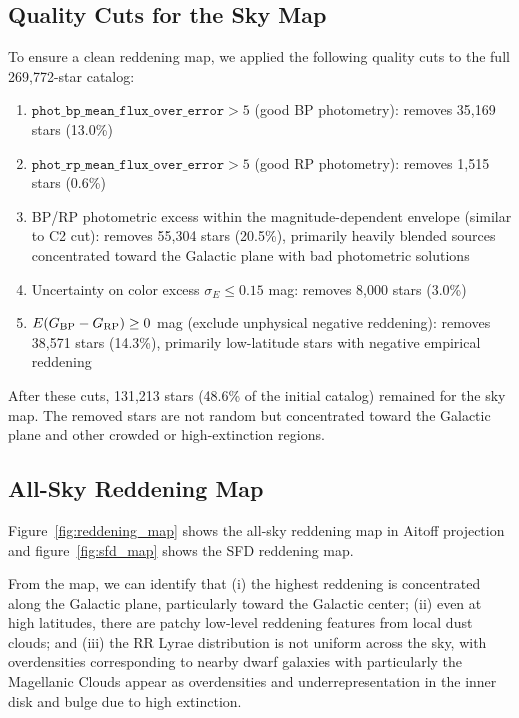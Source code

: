 \documentclass[10pt,preprint2]{aastex}
\begin{document}
\subsection{Quality Cuts for the Sky Map}

To ensure a clean reddening map, we applied the following quality cuts to the full 269,772-star catalog:
\begin{enumerate}
  \item $\texttt{phot\_bp\_mean\_flux\_over\_error} > 5$ (good BP photometry): removes 35,169 stars (13.0\%)
  \item $\texttt{phot\_rp\_mean\_flux\_over\_error} > 5$ (good RP photometry): removes 1,515 stars (0.6\%)
  \item BP/RP photometric excess within the magnitude-dependent envelope (similar to C2 cut): removes 55,304 stars (20.5\%), primarily heavily blended sources concentrated toward the Galactic plane with bad photometric solutions
  \item Uncertainty on color excess $\sigma_E \leq 0.15$ mag: removes 8,000 stars (3.0\%)
  \item $E(G_{\rm BP}-G_{\rm RP}) \geq 0$ mag (exclude unphysical negative reddening): removes 38,571 stars (14.3\%), primarily low-latitude stars with negative empirical reddening
\end{enumerate}

After these cuts, 131,213 stars (48.6\% of the initial catalog) remained for the sky map. The removed stars are not random but concentrated toward the Galactic plane and other crowded or high-extinction regions.

\subsection{All-Sky Reddening Map}

Figure~\ref{fig:reddening_map} shows the all-sky reddening map in Aitoff projection and figure~\ref{fig:sfd_map} shows the SFD reddening map.

From the map, we can identify that (i) the highest reddening is concentrated along the Galactic plane, particularly toward the Galactic center; (ii) even at high latitudes, there are patchy low-level reddening features from local dust clouds; and (iii) the RR Lyrae distribution is not uniform across the sky, with overdensities corresponding to nearby dwarf galaxies with particularly the Magellanic Clouds appear as overdensities and underrepresentation in the inner disk and bulge due to high extinction.
\end{document}
